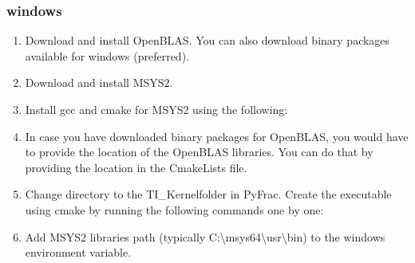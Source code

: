 \documentclass[letterpaper,10pt,english]{sphinxmanual}
\begin{document}
\subsubsection{windows}
\label{\detokenize{GettingStarted:windows}}\begin{enumerate}
%
\item {} 
\sphinxAtStartPar
Download and install OpenBLAS. You can also download binary packages available for windows (preferred).

\item {} 
\sphinxAtStartPar
Download and install MSYS2.

\item {} 
\sphinxAtStartPar
Install gcc and cmake for MSYS2 using the following:

\begin{sphinxVerbatim}[commandchars=\\\{\}]
     
\end{sphinxVerbatim}

\item {} 
\sphinxAtStartPar
In case you have downloaded binary packages for OpenBLAS, you would have to provide the location of the OpenBLAS libraries. You can do that by providing the location in the CmakeLists file.

\item {} 
\sphinxAtStartPar
Change directory to the TI\_Kernelfolder in PyFrac. Create the executable using cmake by running the following commands one by one:

\begin{sphinxVerbatim}[commandchars=\\\{\}]
 
\end{sphinxVerbatim}

\item {} 
\sphinxAtStartPar
Add MSYS2 libraries path (typically C:\textbackslash{}msys64\textbackslash{}usr\textbackslash{}bin) to the windows  environment variable.

\end{enumerate}
\end{document}
